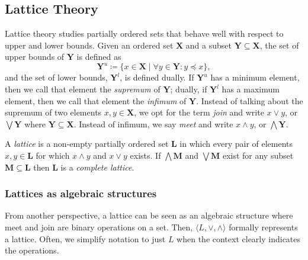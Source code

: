 \subsection{Lattice Theory}
\label{subsection:lattice-theory}
Lattice theory studies partially ordered sets that behave well with respect to upper and lower bounds. Given an ordered set $\mathbf{X}$ and a subset $\mathbf{Y} \subseteq \mathbf{X}$, the set of upper bounds of $\mathbf{Y}$ is defined as
\[
  \mathbf{Y}^u \coloneqq \{x \in \mathbf{X} \mid \forall y \in \mathbf{Y} : y \preceq x\},
\]
and the set of lower bounds, $\mathbf{Y}^l$, is defined dually. If $\mathbf{Y}^u$ has a minimum element, then we call that element the \textit{supremum} of $\mathbf{Y}$; dually, if $\mathbf{Y}^l$ has a maximum element, then we call that element the \textit{infimum} of $\mathbf{Y}$. Instead of talking about the supremum of two elements $x,y \in \mathbf{X}$, we opt for the term \textit{join} and write $x \vee y$, or $\bigvee \mathbf{Y}$ where $\mathbf{Y} \subseteq \mathbf{X}$. Instead of infimum, we say \textit{meet} and write $x \wedge y$, or $\bigwedge \mathbf{Y}$.    

A \textit{lattice} is a non-empty partially ordered set $\mathbf{L}$ in which every pair of elements $x,y \in \mathbf{L}$ for which $x \wedge y$ and $x \vee y$ exists. If $\bigwedge \mathbf{M}$ and $\bigvee \mathbf{M}$ exist for any subset $\mathbf{M} \subseteq \mathbf{L}$ then $\mathbf{L}$ is a \textit{complete lattice}.   


\subsubsection{Lattices as algebraic structures}
\label{subsubsection:lattices-as-algebraic-structures}

From another perspective, a lattice can be seen as an algebraic structure where meet and join are binary operations on a set. Then, $\langle L, \vee, \wedge \rangle$ formally represents a lattice. Often, we simplify notation to just $L$ when the context clearly indicates the operations.

